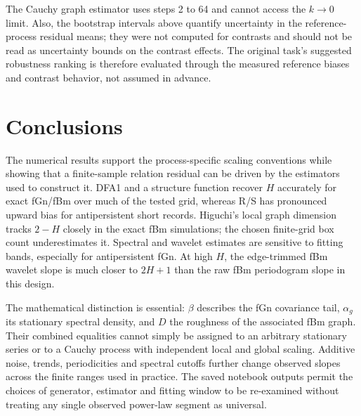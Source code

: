 \documentclass[12pt,twocolumn]{article}
\begin{document}
The Cauchy graph estimator uses steps 2 to 64 and cannot access the $k\to0$ limit. Also, the bootstrap intervals above quantify uncertainty in the reference-process residual means; they were not computed for contrasts and should not be read as uncertainty bounds on the contrast effects. The original task's suggested robustness ranking is therefore evaluated through the measured reference biases and contrast behavior, not assumed in advance.

\section{Conclusions}

The numerical results support the process-specific scaling conventions while showing that a finite-sample relation residual can be driven by the estimators used to construct it. DFA1 and a structure function recover $H$ accurately for exact fGn/fBm over much of the tested grid, whereas R/S has pronounced upward bias for antipersistent short records. Higuchi's local graph dimension tracks $2-H$ closely in the exact fBm simulations; the chosen finite-grid box count underestimates it. Spectral and wavelet estimates are sensitive to fitting bands, especially for antipersistent fGn. At high $H$, the edge-trimmed fBm wavelet slope is much closer to $2H+1$ than the raw fBm periodogram slope in this design.

The mathematical distinction is essential: $\beta$ describes the fGn covariance tail, $\alpha_g$ its stationary spectral density, and $D$ the roughness of the associated fBm graph. Their combined equalities cannot simply be assigned to an arbitrary stationary series or to a Cauchy process with independent local and global scaling. Additive noise, trends, periodicities and spectral cutoffs further change observed slopes across the finite ranges used in practice. The saved notebook outputs permit the choices of generator, estimator and fitting window to be re-examined without treating any single observed power-law segment as universal.



\end{document}
